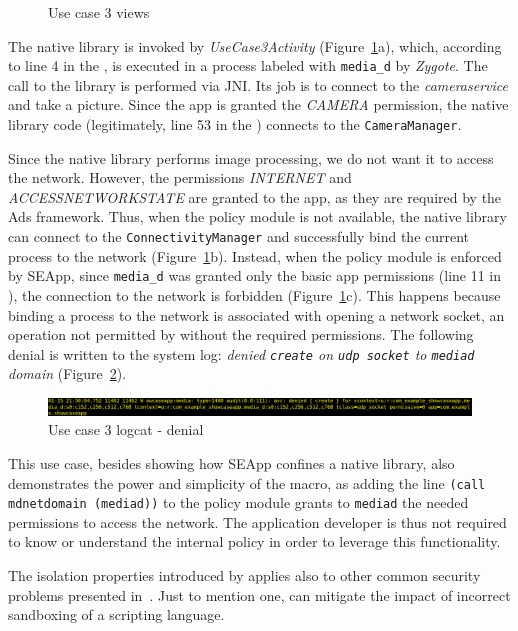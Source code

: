 \begin{figure}[h]
  \caption{\label{fig:seapp_uc3_views} Use case 3 views}
\end{figure}

The native library is invoked by {\em UseCase3Activity}
(Figure~\ref{fig:seapp_uc3_views}a), which, according to line 4 in the
\seappcontexts, is executed in a process labeled with {\tt media\_d}
by {\em Zygote}.  The call to the library is performed via JNI. Its
job is to connect to the {\em camera\textunderscore service} and take
a picture.  Since the app is granted the {\em CAMERA} permission, the
native library code (legitimately, line 53 in the \sepolicy) connects
to the {\tt CameraManager}.

Since the native library performs image processing, we do not want it
to access the network. However, the permissions {\em INTERNET} and
{\em ACCESS\textunderscore NETWORK\textunderscore STATE} are granted
to the app, as they are required by the Ads framework.  Thus, when the
policy module is not available, the native library can connect to the
{\tt ConnectivityManager} and successfully bind the current process to
the network (Figure~\ref{fig:seapp_uc3_views}b).  Instead, when the
policy module is enforced by SEApp, since {\tt media\_d} was granted
only the basic app permissions (line 11 in \sepolicy), the connection
to the network is forbidden (Figure~\ref{fig:seapp_uc3_views}c).  This
happens because binding a process to the network is associated with
opening a network socket, an operation not permitted by \sel without
the required permissions. The following denial is written to the
system log: {\em denied {\tt create} on {\tt udp\textunderscore
    socket} to {\tt media\textunderscore d} domain}
(Figure~\ref{fig:seapp_uc3_logcat}).

\begin{figure}[h]
  \centering
  \includegraphics[width=\textwidth]{chapters/seapp/figs/ae/uc35.png}
  \caption{\label{fig:seapp_uc3_logcat} Use case 3 logcat - \sel denial}  
\end{figure}      

This use case, besides showing how SEApp confines a native library,
also demonstrates the power and simplicity of the macro, as adding the
line {\tt (call md\textunderscore netdomain (media\textunderscore d))}
to the policy module grants to {\tt media\textunderscore d} the needed
permissions to access the network.  The application developer is thus
not required to know or understand the internal \sel policy in order
to leverage this functionality.

The isolation properties introduced by \pap applies also to other
common security problems presented
in~\cite{seapp_common_play_protect_vulnerabilites}. Just to mention
one, \pap can mitigate the impact of incorrect sandboxing of a
scripting language.

